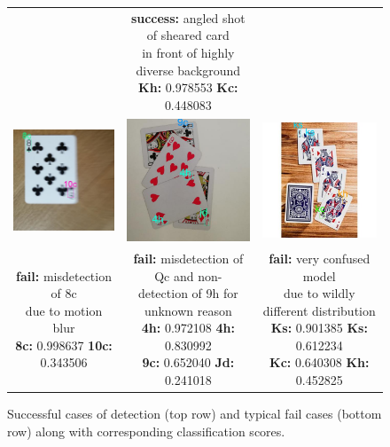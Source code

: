 \documentclass[a4paper]{article}
\begin{document}
\begin{figure}[h]
\begin{tabular}{ccc}
{} & \makecell{\textbf{success:}  angled shot of sheared card \\ in front of highly diverse background \\\textbf{Kh:} 0.978553
\textbf{Kc:} 0.448083
}\\[6pt]
  \includegraphics[width=44mm]{images/fail1} &   \includegraphics[width=44mm]{images/fail2} &   \includegraphics[width=44mm]{images/fail3}\\
\makecell{\textbf{fail:}  misdetection of 8c \\ due to motion blur \\\textbf{8c:} 0.998637
\textbf{10c:} 0.343506
} & \makecell{\textbf{fail:} misdetection of Qc and non- \\detection of 9h for unknown reason \\
\textbf{4h:} 0.972108
\textbf{4h:} 0.830992\\
\textbf{9c:} 0.652040
\textbf{Jd:} 0.241018} & \makecell{\textbf{fail:} very confused model \\ due to wildly different distribution \\ \textbf{Ks:} 0.901385
\textbf{Ks:} 0.612234\\
\textbf{Kc:} 0.640308
\textbf{Kh:} 0.452825
} \\[6pt]



\end{tabular}
\caption{Successful cases of detection (top row) and typical fail cases (bottom row) along with corresponding classification scores.}
\label{fig:testcases}
\end{figure}
\end{document}
